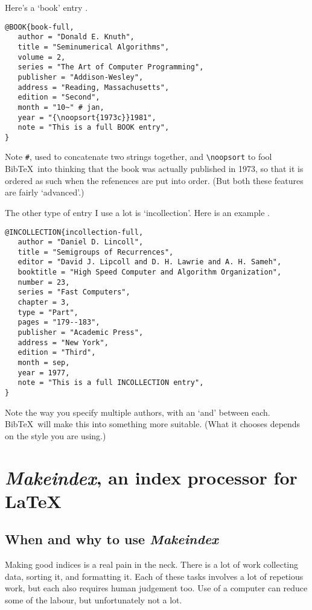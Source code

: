 \documentclass[a4paper]{article}
\newcommand{\BibTeX}{{\sc Bib}\TeX}
\begin{document}
Here's a `book' entry \cite{book-full}.
\begin{verbatim}
@BOOK{book-full,
   author = "Donald E. Knuth",
   title = "Seminumerical Algorithms",
   volume = 2,
   series = "The Art of Computer Programming",
   publisher = "Addison-Wesley",
   address = "Reading, Massachusetts",
   edition = "Second",
   month = "10~" # jan,
   year = "{\noopsort{1973c}}1981",
   note = "This is a full BOOK entry",
}
\end{verbatim}
Note \verb|#|, used to concatenate two strings together,
and \verb|\noopsort| to fool \BibTeX\ into thinking
that the book was actually published in 1973, so that it is
ordered as such when the refenences are put into order.
(But both these features are fairly `advanced'.)

The other type of entry I use a lot is `incollection'.  Here 
is
an example \cite{incollection-full}.
\begin{verbatim}
@INCOLLECTION{incollection-full,
   author = "Daniel D. Lincoll",
   title = "Semigroups of Recurrences",
   editor = "David J. Lipcoll and D. H. Lawrie and A. H. Sameh",
   booktitle = "High Speed Computer and Algorithm Organization",
   number = 23,
   series = "Fast Computers",
   chapter = 3,
   type = "Part",
   pages = "179--183",
   publisher = "Academic Press",
   address = "New York",
   edition = "Third",
   month = sep,
   year = 1977,
   note = "This is a full INCOLLECTION entry",
}
\end{verbatim}
Note the way you specify multiple authors, with an `and' between each.
\BibTeX\ will make this into something more suitable.  (What it chooses
depends on the style you are using.)

\section{{\it Makeindex}, an index processor for \LaTeX}

\subsection{When and why to use {\it Makeindex}}

Making good indices is a real pain in the neck.  There is a lot of
work collecting data, sorting it, and formatting it.  Each of these
tasks involves a lot of repetious work, but each also requires human
judgement too.  Use of a computer can reduce some of the labour,
but unfortunately not a lot.
\end{document}
